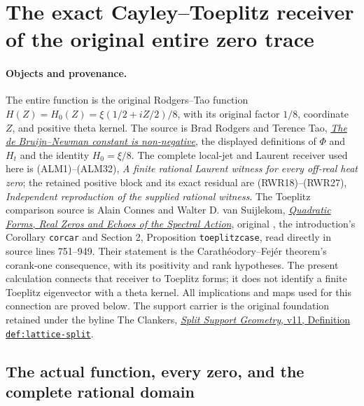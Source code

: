 \section{The exact Cayley--Toeplitz receiver of the original entire zero trace}
\label{sec:cayley-toeplitz-full-receiver}

\paragraph{Objects and provenance.}
The entire function is the original Rodgers--Tao function
$H(Z)=H_0(Z)=\xi(1/2+iZ/2)/8$, with its original factor $1/8$,
coordinate $Z$, and positive theta kernel. The source is Brad Rodgers
and Terence Tao, \href{https://arxiv.org/abs/1801.05914v5}{\emph{The
de Bruijn--Newman constant is non-negative}}, the displayed definitions
of $\Phi$ and $H_t$ and the identity $H_0=\xi/8$.
The complete local-jet and Laurent receiver used here is (ALM1)--(ALM32),
\emph{A finite rational Laurent witness for every off-real heat zero};
the retained positive block and its exact residual are (RWR18)--(RWR27),
\emph{Independent reproduction of the supplied rational witness}.
The Toeplitz comparison source is Alain Connes and Walter D. van
Suijlekom, \href{https://arxiv.org/abs/2511.23257v1}{\emph{Quadratic
Forms, Real Zeros and Echoes of the Spectral Action}}, original
,
the introduction's Corollary \texttt{corcar} and Section 2,
Proposition \texttt{toeplitzcase}, read directly in source lines
751--949. Their statement is the Carath\'eodory--Fej\'er theorem's
corank-one consequence, with its positivity and rank hypotheses.
The present calculation connects that receiver to Toeplitz forms;
it does not identify a finite Toeplitz eigenvector with a theta kernel.
All implications and maps used for this connection are proved below.
The support carrier is the original foundation retained under the
byline The Clankers,
\href{https://github.com/KokunoYumeto/zeta-function-research-reader/blob/a2851f9eb352e7e4376bc629de86fa4ed9c1c434/workbenches/splitzero-tandem/foundations/split-support-geometry-v11/split_support_geometry_arithmetic_curve_v11.tex}{\emph{Split Support Geometry}, v11, Definition \texttt{def:lattice-split}}.

\subsection{The actual function, every zero, and the complete rational domain}


